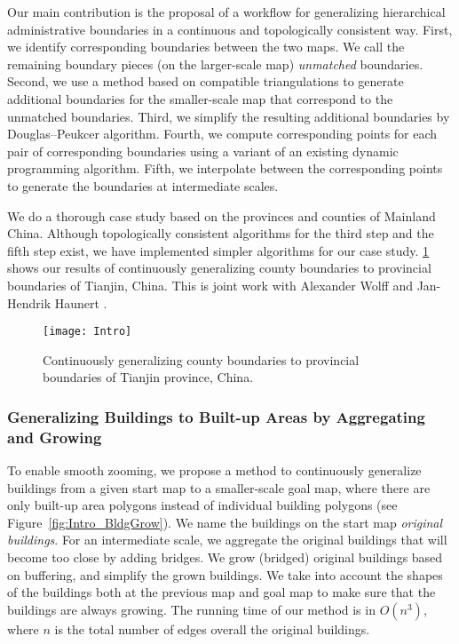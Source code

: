 Our main contribution is the proposal of a workflow for
generalizing hierarchical administrative boundaries in a
continuous and topologically consistent way.  First, we
identify corresponding boundaries between the two maps.
We call the remaining boundary pieces (on the larger-scale map)
\emph{unmatched} boundaries.  Second, we use a method based on 
compatible triangulations to generate
additional boundaries for the smaller-scale map that correspond 
to the
unmatched boundaries.  
Third, we simplify the resulting additional boundaries
by Douglas--Peukcer algorithm.  
Fourth, we compute corresponding points for each pair
of corresponding boundaries using a variant of an existing 
dynamic programming algorithm.  
Fifth, we interpolate between the corresponding points
to generate the boundaries at intermediate scales.

We do a thorough
case study based on the provinces and counties of Mainland China.
Although topologically consistent algorithms for the third step 
and the
fifth step exist, we have implemented simpler algorithms for our
case study. 
\fig\ref{fig:Intro_AdminBound_Tianjin} shows our results of 
continuously generalizing county boundaries 
to provincial boundaries of Tianjin, China.
This is joint work with Alexander Wolff and Jan-Hendrik Haunert
\cite{Peng2016Admin}.

\begin{figure}[tb]
	\centering
	\texttt{[image: Intro]}
	\caption{Continuously generalizing county boundaries to 
	provincial boundaries of Tianjin province, China.}
	\label{fig:Intro_AdminBound_Tianjin}
\end{figure}

\subsubsection{Generalizing Buildings to Built-up Areas 
	by Aggregating and Growing}

To enable smooth zooming, we propose a method to continuously 
generalize buildings from a given start map to a smaller-scale 
goal map, where 
there are only built-up area polygons instead of individual 
building polygons
(see Figure~\ref{fig:Intro_BldgGrow}).
We name the buildings on the start map \emph{original buildings}.
%
For an intermediate scale, 
we aggregate the original buildings that will become too close 
by adding bridges.
We grow (bridged) original buildings based on buffering, 
and simplify the grown buildings.
We take into account the shapes of the buildings 
both at the previous map and goal map to make sure that 
the buildings are always growing.
The running time of our method is in $O(n^3)$,
where $n$ is the total number of edges
overall the original buildings.
%

